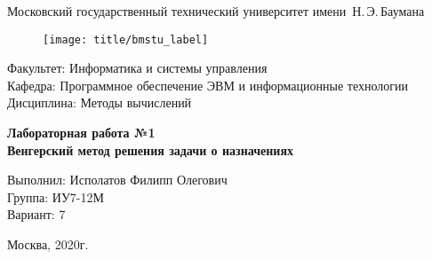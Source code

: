 
\thispagestyle{empty}

\begin{center}
    \Large
    Московский государственный технический университет имени~Н.\,Э.\,Баумана
\end{center}

\begin{figure}[h!]
    \begin{center}
        \texttt{[image: title/bmstu\_label]}
    \end{center}
\end{figure}

{\large
\noindent
Факультет: Информатика и системы управления\\[2mm]
\noindent
Кафедра: Программное обеспечение ЭВМ и информационные технологии\\[2mm]
\noindent
Дисциплина: Методы вычислений
\vspace{1.5cm}}

\begin{center}
    \Large
    \textbf{Лабораторная работа №1} \\
    \textbf{Венгерский метод решения задачи о назначениях} \\
\end{center}
\vfill

\hfill\begin{minipage}{0.35\textwidth}
    Выполнил: Исполатов Филипп Олегович\\
    Группа: ИУ7-12М \\
    Вариант: 7
\end{minipage}
\vfill

\begin{center}
    Москва, 2020г.
\end{center}